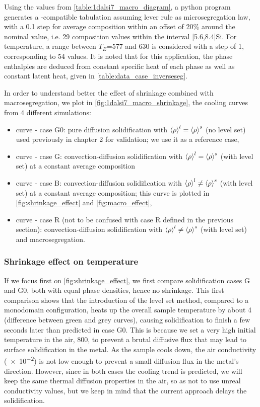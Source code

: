 Using the values from \cref{table:1dalsi7_macro_diagram}, a python program generates a \cimlib-compatible tabulation assuming lever rule as microsegregation law, 
with a \SI{0.1}{\ucomposition} step for average composition within an offset of 20\% around the nominal value, i.e.
29 composition values within the interval [5.6,8.4]\si{\ucomposition}Si.
For temperature, a range between $T_E$=\SI{577}{\udegC} and \SI{630}{\udegC} is considered with a step of \SI{1}{\udegC}, corresponding to 54 values. It is noted that for this application,
the phase enthalpies are deduced from constant specific heat of each phase as well as constant latent heat, given in \cref{table:data_case_inverseseg}.

In order to understand better the effect of shrinkage combined with macrosegregation, we plot in \cref{fig:1dalsi7_macro_shrinkage},
the cooling curves from 4 different simulations: 
\begin{itemize}
\itemsep0em
\item {} curve - case G0: pure diffusion solidification with $\left \langle \rho \right \rangle^l=\left \langle \rho \right \rangle^s$ (no level set) used previously in chapter 2 for validation;
we use it as a reference case,
\item {} curve - case G: convection-diffusion solidification with $\left \langle \rho \right \rangle^l=\left \langle \rho \right \rangle^s$ (with level set) at a constant average composition
\item {} curve - case B: convection-diffusion solidification with $\left \langle \rho \right \rangle^l \neq \left \langle \rho \right \rangle^s$ (with level set) at a constant average composition; this curve is plotted in 
\cref{fig:shrinkage_effect} and \cref{fig:macro_effect},
\item {} curve - case R (not to be confused with case R defined in the previous section): 
convection-diffusion solidification with $\left \langle \rho \right \rangle^l \neq \left \langle \rho \right \rangle^s$ (with level set) and macrosegregation.
\end{itemize}

\subsubsection{Shrinkage effect on temperature}
If we focus first on \cref{fig:shrinkage_effect}, we first compare solidification cases G and G0, both with equal phase densities, hence no shrinkage.
This first comparison shows that the introduction of the level set method, compared to a monodomain configuration, heats up
the overall sample temperature by about \SI{4}{\udegC} (difference between green and grey curves), causing solidification to finish a few seconds later than predicted in case G0.
This is because we set a very high initial temperature in the air, \SI{800}{\udegC}, to prevent a brutal diffusive flux that may lead to surface solidification
in the metal. As the sample cools down, the air conductivity (\SI{e-2}{\uconductivity}) is not low enough to prevent a small diffusion flux in the metal's direction.
However, since in both cases the cooling trend is predicted, we will keep the same thermal diffusion properties in the air, so as not to use unreal conductivity values,
but we keep in mind that the current approach delays the solidification.

